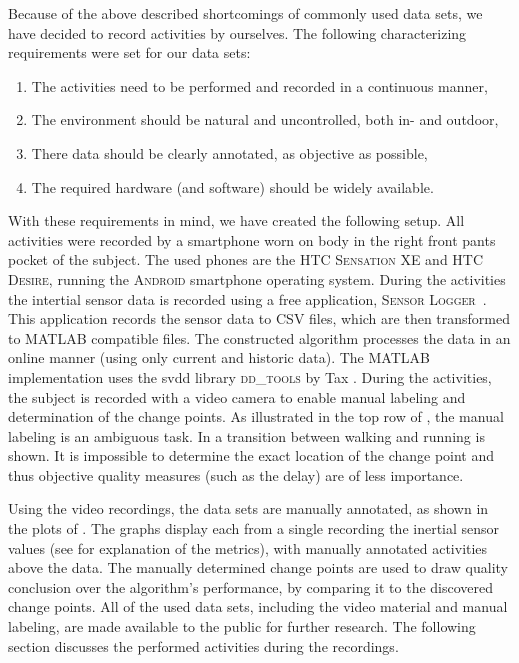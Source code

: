 Because of the above described shortcomings of commonly used data sets, we have decided to record activities by ourselves.
The following characterizing requirements were set for our data sets:
\begin{enumerate}
  \item The activities need to be performed and recorded in a continuous manner,
  \item The environment should be natural and uncontrolled, both in- and outdoor,
  \item There data should be clearly annotated, as objective as possible,
  \item The required hardware (and software) should be widely available.
\end{enumerate}

With these requirements in mind, we have created the following setup.
All activities were recorded by a smartphone worn on body in the right front pants pocket of the subject.
The used phones are the \textsc{HTC Sensation XE} and \textsc{HTC Desire}, running the \textsc{Android} smartphone operating system.
During the activities the intertial sensor data is recorded using a free application, \textsc{Sensor Logger}~\cite{sensorlogger}.
This application records the sensor data to \textsc{CSV} files, which are then transformed to \textsc{MATLAB} compatible files.
The constructed algorithm processes the data in an online manner (using only current and historic data).
The \textsc{MATLAB} implementation uses the \gls{svdd} library \textsc{dd\_tools} by Tax \cite{Ddtools2013}.
During the activities, the subject is recorded with a video camera to enable manual labeling and determination of the change points.
As illustrated in the top row of , the manual labeling is an ambiguous task.
In  a transition between walking and running is shown.
It is impossible to determine the exact location of the change point and thus objective quality measures (such as the delay) are of less importance.

Using the video recordings, the data sets are manually annotated, as shown in the plots of .
The graphs display each from a single recording the inertial sensor values (see  for explanation of the metrics), with manually annotated activities above the data.
The manually determined change points are used to draw quality conclusion over the algorithm's performance, by comparing it to the discovered change points.
All of the used data sets, including the video material and manual labeling, are made available to the public \cite{vlasveld2013continuous} for further research.
The following section discusses the performed activities during the recordings.
